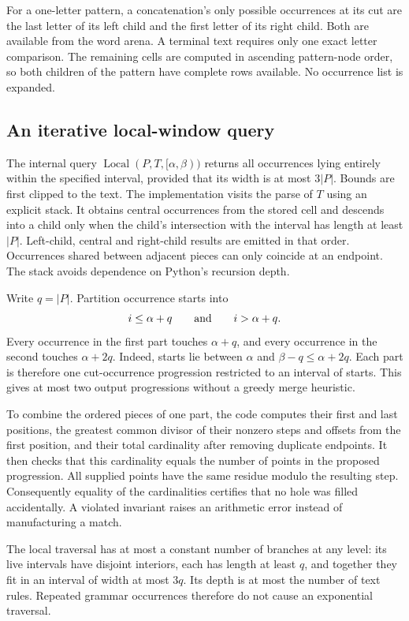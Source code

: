 For a one-letter pattern, a concatenation's only possible occurrences
at its cut are the last letter of its left child and the first letter of
its right child. Both are available from the word arena. A terminal text
requires only one exact letter comparison. The remaining cells are computed
in ascending pattern-node order, so both children of the pattern have
complete rows available. No occurrence list is expanded.

\subsection{An iterative local-window query}

The internal query $\operatorname{Local}(P,T,[\alpha,\beta))$ returns all
occurrences lying entirely within the specified interval, provided that
its width is at most $3|P|$. Bounds are first clipped to the text. The
implementation visits the parse of $T$ using an explicit stack. It obtains
central occurrences from the stored cell and descends into a child only
when the child's intersection with the interval has length at least $|P|$.
Left-child, central and right-child results are emitted in that order.
Occurrences shared between adjacent pieces can only coincide at an endpoint.
The stack avoids dependence on Python's recursion depth.

Write $q=|P|$. Partition occurrence starts into
\[
 i\le\alpha+q\qquad\hbox{and}\qquad i>\alpha+q.
\]
Every occurrence in the first part touches $\alpha+q$, and every occurrence
in the second touches $\alpha+2q$. Indeed, starts lie between $\alpha$ and
$\beta-q\le\alpha+2q$. Each part is therefore one cut-occurrence progression
restricted to an interval of starts. This gives at most two output
progressions without a greedy merge heuristic.

To combine the ordered pieces of one part, the code computes their first
and last positions, the greatest common divisor of their nonzero steps and
offsets from the first position, and their total cardinality after removing
duplicate endpoints. It then checks that this cardinality equals the number
of points in the proposed progression. All supplied points have the same
residue modulo the resulting step. Consequently equality of the cardinalities
certifies that no hole was filled accidentally. A violated invariant raises
an arithmetic error instead of manufacturing a match.

The local traversal has at most a constant number of branches at any level:
its live intervals have disjoint interiors, each has length at least $q$,
and together they fit in an interval of width at most $3q$. Its depth is at
most the number of text rules. Repeated grammar occurrences therefore do
not cause an exponential traversal.

